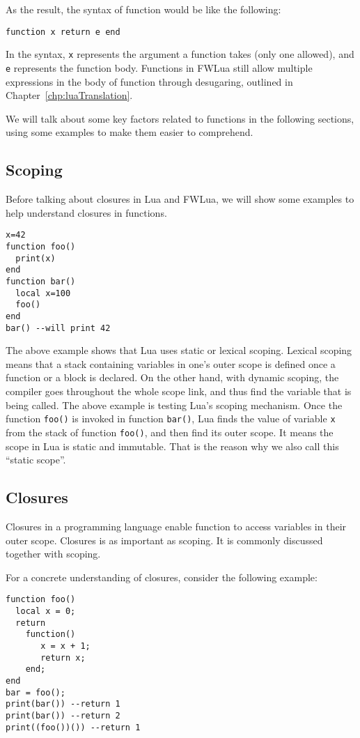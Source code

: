As the result, the syntax of function would be like the following:
\begin{verbatim}
function x return e end
\end{verbatim}
In the syntax, {\tt x} represents the argument a function takes (only one allowed), and {\tt e} represents the function body. Functions in FWLua still allow multiple expressions in the body of function through desugaring, outlined in Chapter~\ref{chp:luaTranslation}.

We will talk about some key factors related to functions in the following sections, using some examples to make them easier to comprehend.

\subsection{Scoping}
Before talking about closures in Lua and FWLua, we will show some examples to help understand closures in functions.
\begin{verbatim}
x=42
function foo()
  print(x)
end
function bar()
  local x=100
  foo()
end
bar() --will print 42
\end{verbatim}
The above example shows that Lua uses static or lexical scoping.
Lexical scoping means that a stack containing variables in one's outer scope is defined once a function or a block is declared.
On the other hand,
with dynamic scoping, the compiler goes throughout the whole scope link, and thus find the variable that is being called.
The above example is testing Lua's scoping mechanism.
Once the function {\tt foo()} is invoked in function {\tt bar()}, Lua finds the value of variable {\tt x} from the stack of function {\tt foo()}, and then find its outer scope.
It means the scope in Lua is static and immutable. That is the reason why we also call this ``static scope''.

\subsection{Closures}
Closures in a programming language enable function to access variables in their outer scope. Closures is as important as scoping. It is commonly discussed together with scoping.

For a concrete understanding of closures, consider the following example:
\begin{verbatim}
function foo()
  local x = 0;
  return 
    function() 
       x = x + 1;
       return x; 
    end;
end
bar = foo();
print(bar()) --return 1
print(bar()) --return 2
print((foo())()) --return 1
\end{verbatim}


